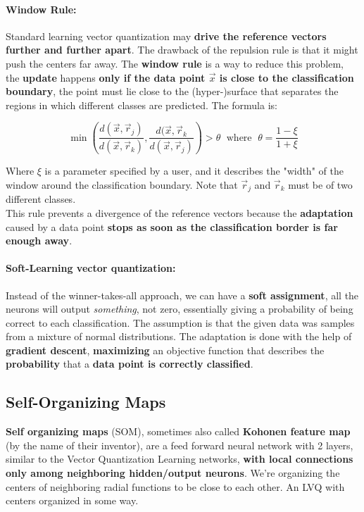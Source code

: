 \documentclass[11pt]{article}
\begin{document}
		\paragraph{Window Rule:} Standard learning vector quantization may \textbf{drive the reference vectors further and further apart}. The drawback of the repulsion rule is that it might push the centers far away. The \textbf{window rule} is a way to reduce this problem, the \textbf{update} happens \textbf{only if the data point $\vec{x}$ is close to the classification boundary}, the point must lie close to the (hyper-)surface that separates the regions in which different classes are predicted. The formula is:
		
		$$ \min\left(\frac{d(\vec{x}, \vec{r}_j)}{d(\vec{x}, \vec{r}_k)}, \frac{d(\vec{x}, \vec{r}_k}{d(\vec{x}, \vec{r}_j)}\right) > \theta \; \text{ where } \; \theta = \frac{1 - \xi}{1 + \xi} $$
		
		Where $\xi$ is a parameter specified by a user, and it describes the "width" of the window around the classification boundary. Note that $\vec{r}_j$ and $\vec{r}_k$ must be of two different classes.\\
		
		This rule prevents a divergence of the reference vectors because the \textbf{adaptation} caused by a data point \textbf{stops as soon as the classification border is far enough away}.\\
		
		\paragraph{Soft-Learning vector quantization:} Instead of the winner-takes-all approach, we can have a \textbf{soft assignment}, all the neurons will output \textit{something}, not zero, essentially giving a probability of being correct to each classification. The assumption is that the given data was samples from a mixture of normal distributions. The adaptation is done with the help of \textbf{gradient descent}, \textbf{maximizing} an objective function that describes the \textbf{probability} that a \textbf{data point is correctly classified}.
		
		
		\newpage
		
		\subsection{Self-Organizing Maps}
		\textbf{Self organizing maps} (SOM), sometimes also called \textbf{Kohonen feature map} (by the name of their inventor), are a feed forward neural network with 2 layers, similar to the Vector Quantization Learning networks, \textbf{with local connections only among neighboring hidden/output neurons}. We're organizing the centers of neighboring radial functions to be close to each other. An LVQ with centers organized in some way. \\
		
\end{document}
